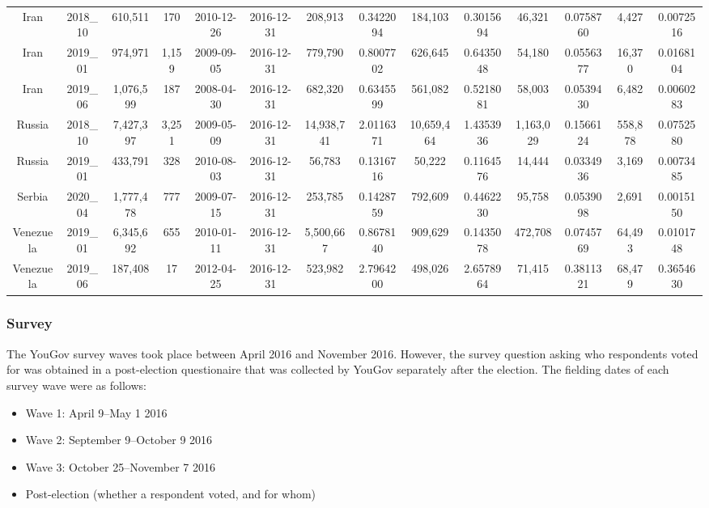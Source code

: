 \documentclass[
  12pt,
]{article}
\providecommand{\tightlist}{%
  \setlength{\itemsep}{0pt}\setlength{\parskip}{0pt}}
\begin{document}
\begin{landscape}
\begin{table}[!h]
{\begin{tabular}[t]{cccccccccccccc}
Iran & 2018\_10 & 610,511 & 170 & 2010-12-26 & 2016-12-31 & 208,913 & 0.3422094 & 184,103 & 0.3015694 & 46,321 & 0.0758760 & 4,427 & 0.0072516\\
\addlinespace
Iran & 2019\_01 & 974,971 & 1,159 & 2009-09-05 & 2016-12-31 & 779,790 & 0.8007702 & 626,645 & 0.6435048 & 54,180 & 0.0556377 & 16,370 & 0.0168104\\
Iran & 2019\_06 & 1,076,599 & 187 & 2008-04-30 & 2016-12-31 & 682,320 & 0.6345599 & 561,082 & 0.5218081 & 58,003 & 0.0539430 & 6,482 & 0.0060283\\
Russia & 2018\_10 & 7,427,397 & 3,251 & 2009-05-09 & 2016-12-31 & 14,938,741 & 2.0116371 & 10,659,464 & 1.4353936 & 1,163,029 & 0.1566124 & 558,878 & 0.0752580\\
Russia & 2019\_01 & 433,791 & 328 & 2010-08-03 & 2016-12-31 & 56,783 & 0.1316716 & 50,222 & 0.1164576 & 14,444 & 0.0334936 & 3,169 & 0.0073485\\
Serbia & 2020\_04 & 1,777,478 & 777 & 2009-07-15 & 2016-12-31 & 253,785 & 0.1428759 & 792,609 & 0.4462230 & 95,758 & 0.0539098 & 2,691 & 0.0015150\\
\addlinespace
Venezuela & 2019\_01 & 6,345,692 & 655 & 2010-01-11 & 2016-12-31 & 5,500,667 & 0.8678140 & 909,629 & 0.1435078 & 472,708 & 0.0745769 & 64,493 & 0.0101748\\
Venezuela & 2019\_06 & 187,408 & 17 & 2012-04-25 & 2016-12-31 & 523,982 & 2.7964200 & 498,026 & 2.6578964 & 71,415 & 0.3811321 & 68,479 & 0.3654630\\
\bottomrule
\end{tabular}}
\end{table}
\vfill
\end{landscape}

\clearpage

\hypertarget{survey}{%
\subsubsection{Survey}\label{survey}}

The YouGov survey waves took place between April 2016 and November 2016. However, the survey question asking who respondents voted for was obtained in a post-election questionaire that was collected by YouGov separately after the election. The fielding dates of each survey wave were as follows:

\begin{itemize}
\tightlist
\item
  Wave 1: April 9--May 1 2016
\item
  Wave 2: September 9--October 9 2016
\item
  Wave 3: October 25--November 7 2016
\item
  Post-election (whether a respondent voted, and for whom)
\end{itemize}
\end{document}
